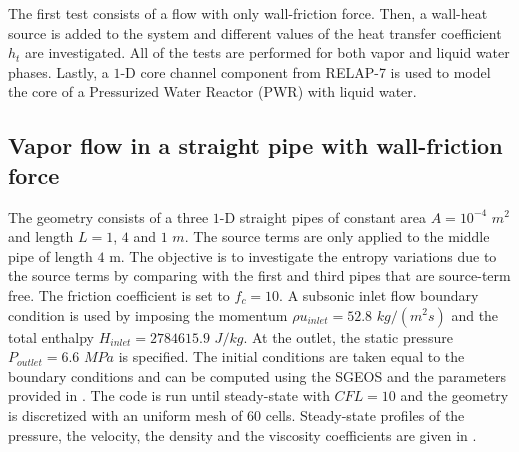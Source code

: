 %
The first test consists of a flow with only wall-friction force. Then, a wall-heat source is added to the system and different values of the heat transfer coefficient $h_t$ are investigated. All of the tests are performed for both vapor and liquid water phases. Lastly, a $1$-D core channel component from RELAP-7 is used to model the core of a Pressurized Water Reactor (PWR) with liquid water.
\subsection{Vapor flow in a straight pipe with wall-friction force} \label{sec:1d-wall-fricition-vapor}
The geometry consists of a three $1$-D straight pipes of constant area $A= 10^{-4}$ $m^2$ and length $L=1$, $4$ and $1$ $m$. The source terms are only applied to the middle pipe of length $4$ m. The objective is to investigate the entropy variations due to the source terms by comparing with the first and third pipes that are source-term free. The friction coefficient is set to $f_c = 10$. A subsonic inlet flow boundary condition is used by imposing the momentum $\rho u_{inlet} = 52.8$ $kg/(m^2 s)$ and the total enthalpy $H_{inlet}=2784615.9$ $J / kg$. At the outlet, the static pressure $P_{outlet}=6.6$ $MPa$ is specified. The initial conditions are taken equal to the boundary conditions and can be computed using the SGEOS and the parameters provided in . The code is run until steady-state with $CFL=10$ and the geometry is discretized with an uniform mesh of $60$ cells. Steady-state profiles of the pressure, the velocity, the density and the viscosity coefficients are given in .
%
